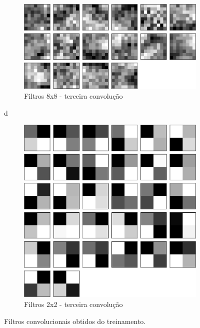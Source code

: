 \documentclass[
	12pt,				%
	oneside,			%
	a4paper,			%
	english,			%
	french,				%
	spanish,			%
	brazil,				%
	]{abntex2}
\begin{document}
\begin{figure}[H]
	\begin{subfigure}{.8\textwidth}
		\centering
		\includegraphics[width=.6\linewidth]{images/fabio/resultados/network_3/filter_convolution2d_3}%
		\caption{Filtros 8x8 - terceira convolução}		
		\label{fig:conv3_filtro}	
	\end{subfigure}%
d
	\begin{subfigure}{.8\textwidth}
	\centering
	\includegraphics[width=.6\linewidth]{images/fabio/resultados/network_3/filter_convolution2d_4}%
	\caption{Filtros 2x2 - terceira convolução}		
	\label{fig:conv4_filtro}	
\end{subfigure}%
	\caption{Filtros convolucionais obtidos do treinamento.}
		\label{fig:convs_filtros}
\end{figure}
\end{document}
